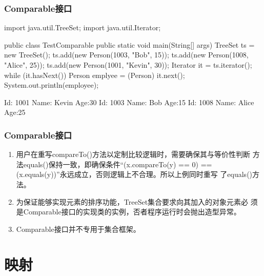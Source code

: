 \begin{frame}[fragile] %
  \frametitle{Comparable接口}


  \begin{javaCode}
    import java.util.TreeSet;
    import java.util.Iterator;

    public class TestComparable {
      public static void main(String[] args) {
        TreeSet ts = new TreeSet();
        ts.add(new Person(1003, "Bob", 15));
        ts.add(new Person(1008, "Alice", 25));
        ts.add(new Person(1001, "Kevin", 30));
      }
      Iterator it = ts.iterator();
      while (it.hasNext()) {
        Person emplyee  = (Person) it.next();
        System.out.println(employee);
      }
    }
  \end{javaCode}

  \begin{stdoutCode}
    Id: 1001 Name: Kevin Age:30
    Id: 1003 Name: Bob Age:15
    Id: 1008 Name: Alice Age:25
  \end{stdoutCode}
\end{frame}

\begin{frame}[fragile] %
  \frametitle{Comparable接口}


  \begin{enumerate}[<+-| alert@+>]\kai
  \item 用户在重写compareTo()方法以定制比较逻辑时，需要确保其与等价性判断
    方法equals()保持一致，即确保条件“{\Red (x.compareTo(y) == 0) ==
      (x.equals(y))}”永远成立，否则逻辑上不合理。所以上例同时重写
    了equals()方法。
  \item 为保证能够实现元素的排序功能，TreeSet集合要求向其加入的对象元素必
    须是Comparable接口的实现类的实例，否者程序运行时会抛出{\Red 造型异常}。
  \item Comparable接口并不专用于集合框架。
  \end{enumerate}
\end{frame}

\section{映射}

